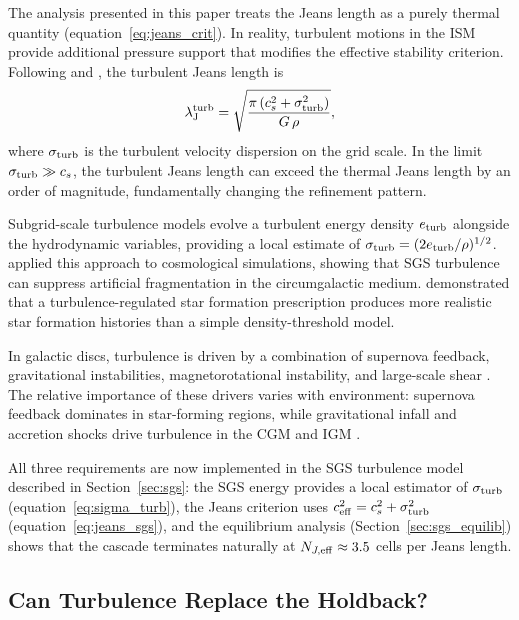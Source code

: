 \documentclass[fleqn,usenatbib]{mnras}
\newcommand{\lJ}{\lambda_{\rm J}}
\begin{document}
The analysis presented in this paper treats the Jeans length as a
purely thermal quantity (equation~\ref{eq:jeans_crit}).  In reality,
turbulent motions in the ISM provide additional pressure support that
modifies the effective stability criterion.  Following
\citet{Chandrasekhar1951} and \citet{Bonazzola1987}, the turbulent
Jeans length is
\begin{equation}
  \lJ^{\rm turb} =
  \sqrt{\frac{\pi\,(c_s^2 + \sigma_{\rm turb}^2)}{G\,\rho}},
  \label{eq:jeans_turb_disc}
\end{equation}
where $\sigma_{\rm turb}$ is the turbulent velocity dispersion on the
grid scale.  In the limit $\sigma_{\rm turb} \gg c_s$, the turbulent
Jeans length can exceed the thermal Jeans length by an order of
magnitude, fundamentally changing the refinement pattern.

Subgrid-scale turbulence models \citep{Schmidt2006, Schmidt2011}
evolve a turbulent energy density $e_{\rm turb}$ alongside the
hydrodynamic variables, providing a local estimate of $\sigma_{\rm
turb} = (2 e_{\rm turb}/\rho)^{1/2}$.  \citet{Rennehan2021} applied
this approach to cosmological simulations, showing that SGS turbulence
can suppress artificial fragmentation in the circumgalactic medium.
\citet{Semenov2016} demonstrated that a turbulence-regulated star
formation prescription produces more realistic star formation
histories than a simple density-threshold model.

In galactic discs, turbulence is driven by a combination of supernova
feedback, gravitational instabilities, magnetorotational instability,
and large-scale shear \citep{Robertson2008, Kim2017, Hopkins2018}.
The relative importance of these drivers varies with environment:
supernova feedback dominates in star-forming regions, while
gravitational infall and accretion shocks drive turbulence in the CGM
and IGM \citep{Iapichino2011}.

All three requirements are now implemented in the SGS turbulence
model described in Section~\ref{sec:sgs}: the SGS energy provides a
local estimator of $\sigma_{\rm turb}$
(equation~\ref{eq:sigma_turb}), the Jeans criterion uses
$c_{\rm eff}^2 = c_s^2 + \sigma_{\rm turb}^2$
(equation~\ref{eq:jeans_sgs}), and the equilibrium analysis
(Section~\ref{sec:sgs_equilib}) shows that the cascade terminates
naturally at $N_{J,\rm eff} \approx 3.5$ cells per Jeans length.


\subsection{Can Turbulence Replace the Holdback?}
\label{sec:turb_vs_holdback}
\end{document}
